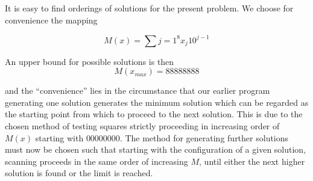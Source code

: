 It is easy to find orderings of solutions for the present problem. We choose
for convenience the mapping

\begin{equation*}
    M(x) = \displaystyle\sum{j = 1}^{8} x_j 10^{j-1}
\end{equation*}

An upper bound for possible solutions is then 
\begin{equation*}
    M(x_{max}) = 88888888
\end{equation*}

and the ``convenience'' lies in the circumstance that our earlier program
generating one solution generates the minimum solution which can be regarded as
the starting point from which to proceed to the next solution.  This is due to
the chosen method of testing squares strictly proceeding in increasing order of
$M(x)$ starting with $00000000$.  The method for generating further solutions
must now be chosen such that starting with the configuration of a given
solution, scanning proceeds in the same order of increasing $M$, until either
the next higher solution is found or the limit is reached.
